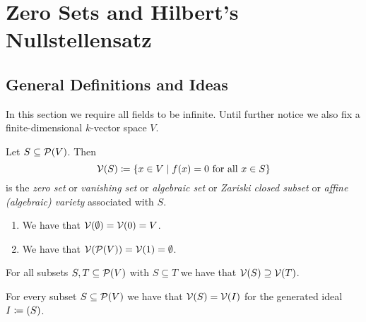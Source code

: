 \section{Zero Sets and Hilbert’s Nullstellensatz}





\subsection{General Definitions and Ideas}


\begin{fluff}
  In this section we require all fields to be infinite.
  Until further notice we also fix a finite-dimensional $k$-vector space $V$.
\end{fluff}


\begin{definition}
  Let $S \subseteq \mathcal{P}(V)$.
  Then
  \[
              \mathcal{V}(S)
    \coloneqq \{
                x \in V
              \mid
                \text{$f(x) = 0$ for all $x \in S$}
              \}
  \]
  is the \emph{zero set} or \emph{vanishing set} or \emph{algebraic set} or \emph{Zariski closed subset} or \emph{affine \textup(algebraic\textup) variety} associated with $S$.
\end{definition}


\begin{example}
  \label{example: examples of algebraic subsets}
  \leavevmode
  \begin{enumerate}
    \item
      We have that $\mathcal{V}(\emptyset) = \mathcal{V}(0) = V$.
    \item
      We have that $\mathcal{V}(\mathcal{P}(V)) = \mathcal{V}(1) = \emptyset$.
  \end{enumerate}
\end{example}




\begin{lemma}
  For all subsets $S, T \subseteq \mathcal{P}(V)$ with $S \subseteq T$ we have that $\mathcal{V}(S) \supseteq \mathcal{V}(T)$.
\end{lemma}


\begin{lemma}
  \label{lemma: vanishing set is the same for generated ideal}
  For every subset $S \subseteq \mathcal{P}(V)$ we have that $\mathcal{V}(S) = \mathcal{V}(I)$ for the generated ideal $I \coloneqq (S)$.
\end{lemma}


